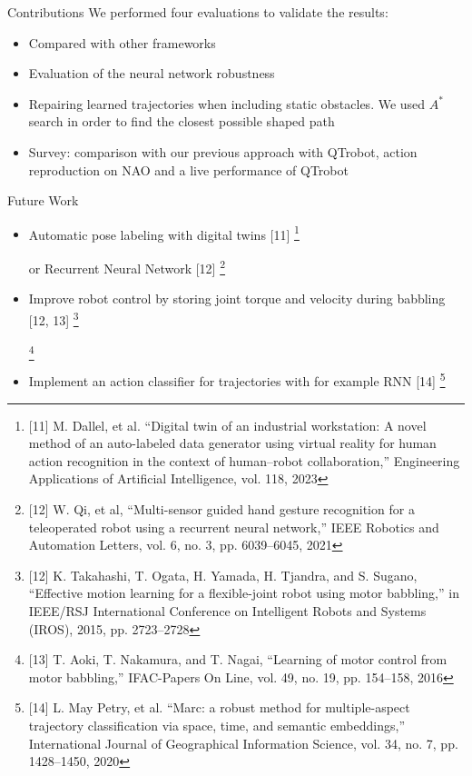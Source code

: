 \documentclass[aspectratio=169]{beamer}
\newcommand\blfootnote[1]{%
	\begingroup
	\renewcommand\thefootnote{}\footnote{#1}%
	\addtocounter{footnote}{-1}%
	\endgroup
}
\begin{document}
\begin{frame}{Contributions}	
	We performed four evaluations to validate the results:
	\newline
	\begin{itemize}
		\item Compared with other frameworks
		\newline
		\item Evaluation of the neural network robustness
		\newline
		\item Repairing learned trajectories when including static obstacles. We used $A^*$ search in order to find the closest possible shaped path
		\newline
		\item Survey: comparison with our previous approach with QTrobot, action reproduction on NAO and a live performance of QTrobot
	\end{itemize}
\end{frame}


\begin{frame}{Future Work}
	\begin{itemize}
		\item Automatic pose labeling with digital twins [11]\blfootnote{[11] M. Dallel, et al. “Digital twin of an industrial workstation: A novel method of an auto-labeled data generator using virtual reality for human action recognition in the context of human–robot collaboration,” Engineering Applications of Artificial Intelligence, vol. 118, 2023} or Recurrent Neural Network [12] \blfootnote{[12] W. Qi, et al, “Multi-sensor guided hand gesture recognition for a teleoperated robot using a recurrent neural network,” IEEE Robotics and Automation Letters, vol. 6, no. 3, pp. 6039–6045, 2021}
		\newline
		\item Improve robot control by storing joint torque and velocity during babbling [12, 13] \blfootnote{[12] K. Takahashi, T. Ogata, H. Yamada, H. Tjandra, and S. Sugano, “Effective motion learning for a flexible-joint robot using motor babbling,” in IEEE/RSJ International Conference on Intelligent Robots and Systems (IROS), 2015, pp. 2723–2728}
		\blfootnote{[13] T. Aoki, T. Nakamura, and T. Nagai, “Learning of motor control from motor babbling,” IFAC-Papers On Line, vol. 49, no. 19, pp. 154–158, 2016}
		\newline
		\item Implement an action classifier for trajectories with for example RNN [14] \blfootnote{[14] L. May Petry, et al. “Marc: a robust method for multiple-aspect trajectory classification via space, time, and semantic embeddings,” International Journal of Geographical Information Science, vol. 34, no. 7, pp. 1428–1450, 2020}
	\end{itemize}
\end{frame}
\end{document}
